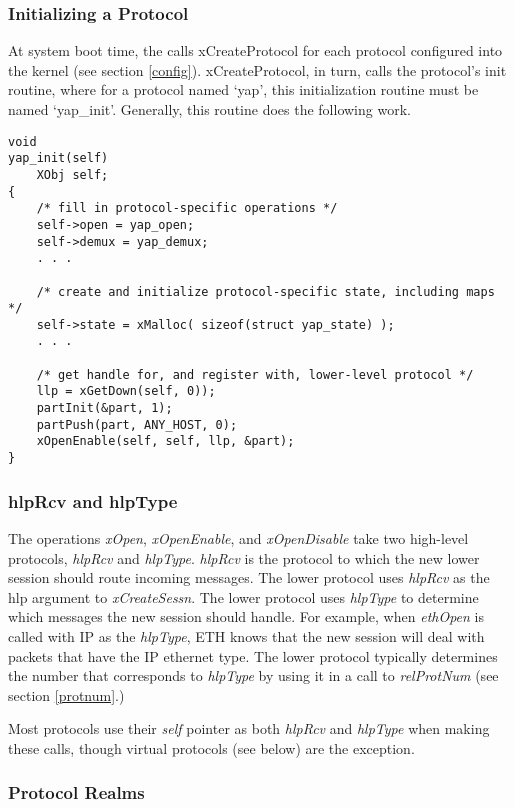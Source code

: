 \subsubsection{Initializing a Protocol}

At system boot time, the \xk{} calls xCreateProtocol for each protocol 
configured into the kernel (see section \ref{config}). 
xCreateProtocol, in turn, 
calls the protocol's init routine,
where for a protocol named `yap', this initialization routine 
must be named `yap\_init'. 
Generally, this routine does the following work.

\begin{verbatim}
void
yap_init(self)
    XObj self;
{
    /* fill in protocol-specific operations */
    self->open = yap_open;
    self->demux = yap_demux;
    . . .

    /* create and initialize protocol-specific state, including maps */
    self->state = xMalloc( sizeof(struct yap_state) );
    . . .

    /* get handle for, and register with, lower-level protocol */
    llp = xGetDown(self, 0));
    partInit(&part, 1);
    partPush(part, ANY_HOST, 0);
    xOpenEnable(self, self, llp, &part);
}
\end{verbatim}



\subsubsection{hlpRcv and hlpType}
\label{hlpdesc}

The operations {\em xOpen}, {\em xOpenEnable}, and {\em xOpenDisable}
take two high-level protocols, {\em hlpRcv} and {\em hlpType}.  {\em
hlpRcv} is the protocol to which the new lower session should route
incoming messages.  The lower protocol uses {\em hlpRcv} as the hlp
argument to {\em xCreateSessn}. The lower protocol uses {\em hlpType}
to determine which messages the new session should handle.  For
example, when {\em ethOpen} is called with IP as the {\em hlpType},
ETH knows that the new session will deal with packets that have the IP
ethernet type.  The lower protocol typically determines the number
that corresponds to {\em hlpType} by using it in a call to {\em
relProtNum} (see section \ref{protnum}.)

Most protocols use their {\em self} pointer as both {\em hlpRcv} and
{\em hlpType} when making these calls, though virtual protocols (see
below) are the exception.

\subsubsection{Protocol Realms}

